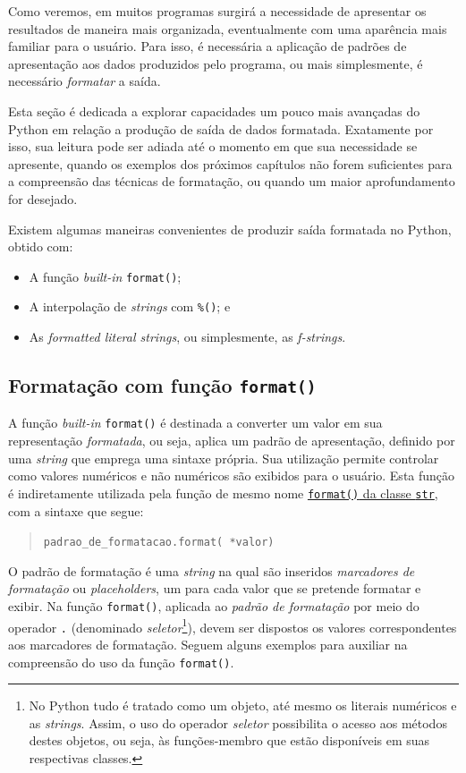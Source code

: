 \documentclass[
]{book}
\providecommand{\tightlist}{%
  \setlength{\itemsep}{0pt}\setlength{\parskip}{0pt}}
\begin{document}
Como veremos, em muitos programas surgirá a necessidade de apresentar os resultados de maneira mais organizada, eventualmente com uma aparência mais familiar para o usuário. Para isso, é necessária a aplicação de padrões de apresentação aos dados produzidos pelo programa, ou mais simplesmente, é necessário \emph{formatar} a saída.

Esta seção é dedicada a explorar capacidades um pouco mais avançadas do Python em relação a produção de saída de dados formatada. Exatamente por isso, sua leitura pode ser adiada até o momento em que sua necessidade se apresente, quando os exemplos dos próximos capítulos não forem suficientes para a compreensão das técnicas de formatação, ou quando um maior aprofundamento for desejado.

Existem algumas maneiras convenientes de produzir saída formatada no Python, obtido com:

\begin{itemize}
\tightlist
\item
  A função \emph{built-in} \texttt{format()};
\item
  A interpolação de \emph{strings} com \texttt{\%()}; e
\item
  As \emph{formatted literal strings}, ou simplesmente, as \emph{f-strings}.
\end{itemize}

\hypertarget{e-s-format-funcao}{%
\subsection{\texorpdfstring{Formatação com função \texttt{format()}}{Formatação com função format()}}\label{e-s-format-funcao}}

A função \emph{built-in} \texttt{format()} é destinada a converter um valor em sua representação \emph{formatada}, ou seja, aplica um padrão de apresentação, definido por uma \emph{string} que emprega uma sintaxe própria. Sua utilização permite controlar como valores numéricos e não numéricos são exibidos para o usuário. Esta função é indiretamente utilizada pela função de mesmo nome \href{https://docs.python.org/3/tutorial/inputoutput.html\#the-string-format-method}{\texttt{format()} da classe \texttt{str}}, com a sintaxe que segue:

\begin{quote}
\texttt{\textquotesingle{}padrao\_de\_formatacao\textquotesingle{}.format(\ *valor)}
\end{quote}

O padrão de formatação é uma \emph{string} na qual são inseridos \emph{marcadores de formatação} ou \emph{placeholders}, um para cada valor que se pretende formatar e exibir. Na função \texttt{format()}, aplicada ao \emph{padrão de formatação} por meio do operador \texttt{.} (denominado \emph{seletor}\footnote{No Python tudo é tratado como um objeto, até mesmo os literais numéricos e as \emph{strings}. Assim, o uso do operador \emph{seletor} possibilita o acesso aos métodos destes objetos, ou seja, às funções-membro que estão disponíveis em suas respectivas classes.}), devem ser dispostos os valores correspondentes aos marcadores de formatação. Seguem alguns exemplos para auxiliar na compreensão do uso da função \texttt{format()}.
\end{document}
